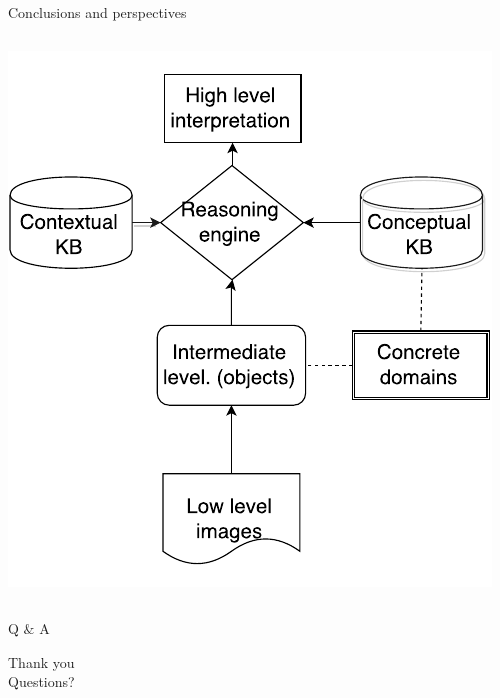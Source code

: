 \documentclass{beamer}
\begin{document}
\begin{frame}{Conclusions and perspectives}
\begin{columns}
  \begin{column}{.3\textwidth}
    \includegraphics[width=.9\textwidth, height=.6\textheight]{images/flowchart_cp_crop.pdf}
  \end{column}


\end{columns}
\end{frame}


\begin{frame}{Q $\&$ A}
\begin{center}
 Thank you\\

Questions?
\end{center}
\end{frame}
\end{document}
